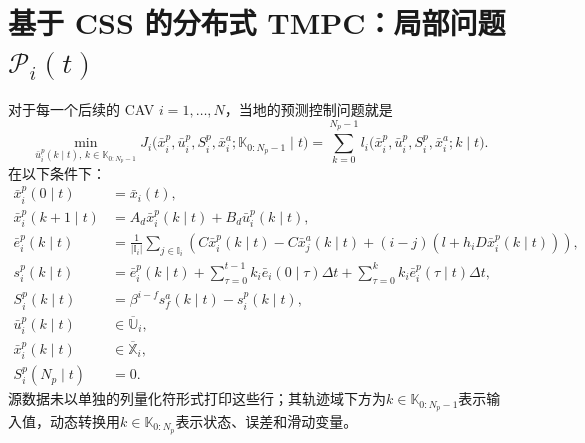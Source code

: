 \documentclass{article}
\begin{document}
\section*{基于 CSS 的分布式 TMPC：局部问题 $\mathscr P_i(t)$}
对于每一个后续的 CAV $i=1,\ldots,N$，当地的预测控制问题就是
\begin{equation}
\min_{\bar u_i^p(k\mid t),\,k\in\mathbb K_{0:N_p-1}}
J_i\bigl(\bar x_i^p,\bar u_i^p,S_i^p,\bar x_i^a;\mathbb K_{0:N_p-1}\mid t\bigr)
=\sum_{k=0}^{N_p-1}l_i\bigl(\bar x_i^p,\bar u_i^p,S_i^p,\bar x_i^a;k\mid t\bigr).
\tag{14a}
\end{equation}
在以下条件下：
\begin{align}
\bar x_i^p(0\mid t)&=\bar x_i(t),\tag{14b}\\
\bar x_i^p(k+1\mid t)&=A_d\bar x_i^p(k\mid t)+B_d\bar u_i^p(k\mid t),\tag{14c}\\
\bar e_i^p(k\mid t)&=\frac{1}{|\mathbb I_i|}\sum_{j\in\mathbb I_i}
\left(C\bar x_i^p(k\mid t)-C\bar x_j^a(k\mid t)
 +(i-j)\left(l+h_iD\bar x_i^p(k\mid t)\right)\right),\tag{14d}\\
s_i^p(k\mid t)&=\bar e_i^p(k\mid t)
 +\sum_{\tau=0}^{t-1}k_i\bar e_i(0\mid\tau)\Delta t
 +\sum_{\tau=0}^{k}k_i\bar e_i^p(\tau\mid t)\Delta t,\tag{14e}\\
S_i^p(k\mid t)&=\beta^{i-f}s_f^a(k\mid t)-s_i^p(k\mid t),\tag{14f}\\
\bar u_i^p(k\mid t)&\in\overline{\mathbb U}_i,\tag{14g}\\
\bar x_i^p(k\mid t)&\in\overline{\mathbb X}_i,\tag{14h}\\
S_i^p(N_p\mid t)&=0.\tag{14i}
\end{align}
源数据未以单独的列量化符形式打印这些行；其轨迹域下方为$k\in\mathbb K_{0:N_p-1}$表示输入值，动态转换用$k\in\mathbb K_{0:N_p}$表示状态、误差和滑动变量。
\end{document}
